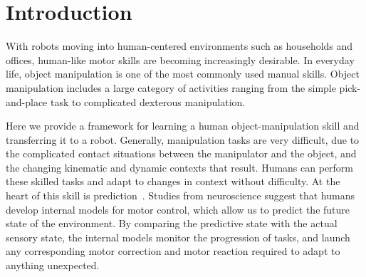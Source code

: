 \section{Introduction}
\label{intro}

With robots moving into human-centered environments such as households
and offices, human-like motor skills are becoming increasingly
desirable. In everyday life, object manipulation is one of the most
commonly used manual skills. Object manipulation includes a large
category of activities ranging from the simple pick-and-place task to
complicated dexterous manipulation.

Here we provide a framework for learning a human object-manipulation skill
and transferring it to a robot.
Generally, manipulation tasks are very difficult, due to the
complicated contact situations between the manipulator and the object,
and the changing kinematic and dynamic contexts that result. Humans
can perform these skilled tasks and adapt to changes in context
without difficulty. At the heart of this skill is
prediction~\citep{flanagan2006control}. Studies from neuroscience
suggest that humans develop internal models for motor control, which
allow us to predict the future state of the environment. By comparing
the predictive state with the actual sensory state, the internal
models monitor the progression of  tasks, and launch any
corresponding motor correction and motor reaction required to
adapt to anything unexpected. %

